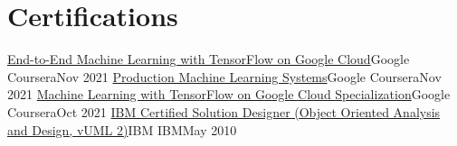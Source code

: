\section{Certifications}
  \resumeSubHeadingListStart

    \resumeSubheading
      {\href{https://www.coursera.org/account/accomplishments/verify/DLHBZAXW55UD}{End-to-End Machine Learning with TensorFlow on Google Cloud}}{Google}
      {Coursera}{Nov 2021} 
    \resumeSubheading
      {\href{https://www.coursera.org/account/accomplishments/verify/A66XLPCJ4N6D}{Production Machine Learning Systems}}{Google}
      {Coursera}{Nov 2021} 
    \resumeSubheading
      {\href{https://www.coursera.org/account/accomplishments/specialization/certificate/JJTMLY8U43XB}{Machine Learning with TensorFlow on Google Cloud Specialization}}{Google}
      {Coursera}{Oct 2021} 
    \resumeSubheading
      {\href{https://drive.google.com/file/d/1xZD_WC_LG5fD0N0FLdJ-ipE5J9z_ZXgH/view?usp=sharing}{IBM Certified Solution Designer (Object Oriented Analysis and Design, vUML 2)}}{IBM}
      {IBM}{May 2010}

  \resumeSubHeadingListEnd
